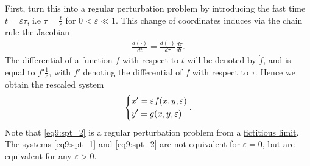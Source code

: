 First, turn this into a regular perturbation problem by introducing the fast time $t = \varepsilon \tau$, i.e $\tau = \frac{t}{\varepsilon}$ for $0 < \varepsilon \ll 1$. This change of coordinates induces via the chain rule the Jacobian
\begin{align}
	\frac{d (\cdot) }{dt} = \frac{d( \cdot) }{d \tau }\frac{d \tau}{dt}.
\end{align}
The differential of a function $f$ with respect to $t$ will be denoted by $\dot{f}$, and is equal to $f' \frac{1}{\varepsilon}$, with $f'$ denoting the differential of $f$ with respect to $\tau$. Hence we obtain the rescaled system
\begin{align}
\begin{dcases}
	x' = \varepsilon f(x,y, \varepsilon) \\
	y' = g(x,y, \varepsilon)
\end{dcases}
. \label{eq9:spt_2}	
\end{align}
Note that \eqref{eq9:spt_2} is a regular perturbation problem from a \underline{fictitious limit}. The systems \eqref{eq9:spt_1} and \eqref{eq9:spt_2} are not equivalent for  $\varepsilon=0$, but are equivalent for any $\varepsilon >0$. 

